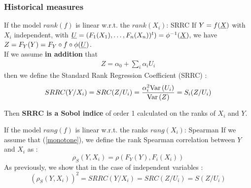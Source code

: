 \documentclass[8pt]{beamer}
\begin{document}
 
 
 

\begin{frame}
\frametitle{Historical measures}
 \small
  
 \begin{block}{If the model $rank(f)$ is  linear w.r.t. the $rank(X_i)$: SRRC}
   If $Y = f({\underline{X}})$ with \alert{$X_i$ independent}, with ${\underline{U}} = (F_1(X_1), \dots, F_n(X_n))^t) = \phi^{-1}({\underline{X}})$, we have $ Z = F_Y(Y) = F_Y \circ f \circ \phi ({\underline{U}})$. \\
   

 If we assume  {\bf in addition} that
    \alert{\begin{align}\label{monotone}
           Z = \alpha_0 +\sum_i \alpha_i U_i
           \end{align}
           }
       then we define the  \alert{ Standard Rank Regression Coefficient (SRRC)} :
          $$
     SRRC(Y/X_i) = SRC(Z / U_i) = \dfrac{\alpha_i^2 \mbox{Var}\left( U_i \right)}{\mbox{Var}\left( Z \right)} = S_i(Z/U_i)
    $$    
       
    Then {\bf SRRC is a Sobol indice} of order 1 calculated on the ranks of $X_i$ and $Y$.
           
  \end{block} 

   
 \begin{block}{If the model $rang(f)$ is  linear w.r.t. the ranks $rang(X_i)$: Spearman}
  If we assume that (\ref{monotone}), we define the \alert{ rank Spearman correlation} between $Y$ and $X_i$ as :
  $$
 \rho_S(Y,X_i) = \rho(F_Y(Y),F_i(X_i))
  $$
  As previously, we show that in the case of  \alert{independent variables} :
  $$
  (\rho_S(Y,X_i))^2 = SRRC(Y/X_i) = SRC(Z / U_i) = S(Z/U_i)
  $$
 
\end{block}
 \end{frame}
\end{document}
